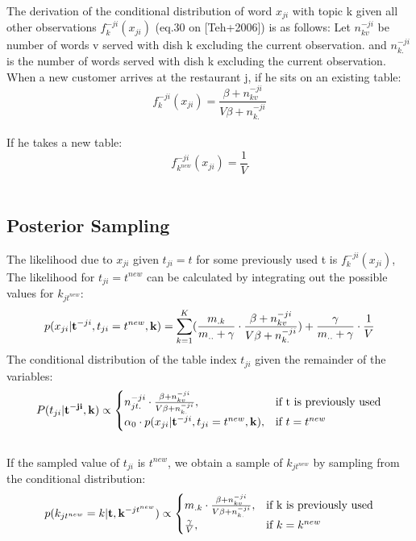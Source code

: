 \documentclass[11pt]{article}
\begin{document}
\begin{spacing}{1.6}
\noindent The derivation of the conditional distribution of word $x_{ji} $ with topic k given all other observations $f^{-ji}_k(x_{ji})$ (eq.30 on [Teh+2006]) is as follows: Let $n^{-ji}_{kv}$ be number of words v served with dish k excluding the current observation. and $n^{-ji}_{k.}$ is the number of words served with dish k excluding the current observation.\\

\noindent When a new customer arrives at the restaurant j, if he sits on an existing table: 
\begin{equation}
f^{-ji}_k(x_{ji})=\frac{\beta+n^{-ji}_{kv}}{V\beta+n^{-ji}_{k.}}
\end{equation}\\
If he takes a new table:
\begin{equation}
f^{-ji}_{k^{new}}(x_{ji})=\frac{1}{V}
\end{equation}\\

\subsection{Posterior Sampling}
\noindent The likelihood due to $x_{ji}$ given $t_{ji}=t$ for some previously used t is $f^{-ji}_k(x_{ji})$, The likelihood for $t_{ji}=t^{new}$ can be calculated by integrating out the possible values for $k_{jt^{new}}$:
\begin{equation}
p(x_{ji}| {\bf{t}}^{-ji},t_{ji}=t^{new},{\bf{k}})=\sum^{K}_{k=1}( \frac{m_{.k}}{m_{..}+\gamma} \cdot \frac{\beta+n^{-ji}_{kv}}{V\beta+n^{-ji}_{k.}}) + \frac{\gamma}{m_{..}+\gamma} \cdot \frac{1}{V}
\end{equation}
The conditional distribution of the table index $t_{ji}$ given the remainder of the variables:
\begin{equation}
    P(t_{ji} | \bf{t}^{-ji}, \bf{k}) \propto
    \begin{cases}
      n^{-ji}_{jt.} \cdot \frac{\beta+n^{-ji}_{kv}}{V\beta+n^{-ji}_{k.}}, & \text{if t is previously used} \\
      \alpha_0 \cdot p(x_{ji}| {\bf{t}}^{-ji},t_{ji}=t^{new},{\bf{k}}) , & \text{if}\ t=t^{new}
    \end{cases}
\end{equation}\\

\noindent If the sampled value of $t_{ji}$ is $t^{new}$, we obtain a sample of $k_{jt^{new}}$ by sampling from the conditional distribution:
\begin{equation}
p(k_{jt^{new}}=k|{\bf{t}},{\bf{k}}^{-jt^{new}}) \propto
    \begin{cases}
      m_{.k} \cdot \frac{\beta+n^{-ji}_{kv}}{V\beta+n^{-ji}_{k.}}, & \text{if k is previously used} \\
      \frac{\gamma}{V}, &\text{if}\ k=k^{new}
    \end{cases}
\end{equation}


\end{spacing}
\end{document}
